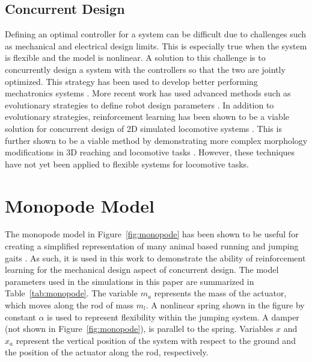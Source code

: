 \documentclass[10pt,twocolumn,letterpaper]{article}
\begin{document}
\subsection{Concurrent Design}

Defining an optimal controller for a system can be difficult due to challenges such as mechanical and electrical design limits. This is especially true when the system is flexible and the model is nonlinear. A solution to this challenge is to concurrently design a system with the controllers so that the two are jointly optimized. This strategy has been used to develop better performing mechatronics systems \cite{Li2001}.  More recent work has used advanced methods such as evolutionary strategies to define robot design parameters \cite{Wang2019}. In addition to evolutionary strategies, reinforcement learning has been shown to be a viable solution for concurrent design of 2D simulated locomotive systems \cite{Ha2019j}. This is further shown to be a viable method by demonstrating more complex morphology modifications in 3D reaching and locomotive tasks \cite{Schaff2019e}. However, these techniques have not yet been applied to flexible systems for locomotive tasks. 


\section{Monopode Model}
\label{sec:monopode_model}

The monopode model in Figure~\ref{fig:monopode} has been shown to be useful for creating a simplified representation of many animal based running and jumping gaits \cite{Blickhan1993a}. As such, it is used in this work to demonstrate the ability of reinforcement learning for the mechanical design aspect of concurrent design. The model parameters used in the simulations in this paper are summarized in Table~\ref{tab:monopode}.
%
The variable $m_a$ represents the mass of the actuator, which moves along the rod of mass $m_l$. A nonlinear spring shown in the figure by constant $\alpha$ is used to represent flexibility within the jumping system. A damper (not shown in Figure~\ref{fig:monopode}), is parallel to the spring. Variables $x$ and $x_a$ represent the vertical position of the system with respect to the ground and the position of the actuator along the rod, respectively.
	
\end{document}
